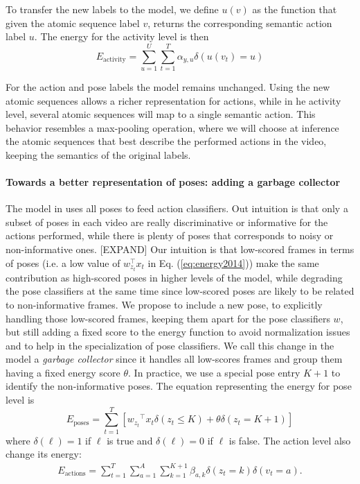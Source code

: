 To transfer the new labels to the model, we define $u(v)$ as the function that given the atomic sequence label $v$, returns the corresponding semantic action label $u$. The energy for the activity level is then
\begin{equation}
E_{\text{activity}} =  \sum_{u=1}^U\sum_{t=1}^T \alpha_{y,u}\delta(u(v_t)=u)
\end{equation}  

For the action and pose labels the model remains unchanged. Using the new atomic sequences allows a richer representation for actions, while in he activity level, several atomic sequences will map to a single semantic action. This behavior resembles a max-pooling operation, where we will choose at inference the atomic sequences that best describe the performed actions in the video, keeping the semantics of the original labels. 

\paragraph{Towards a better representation of poses: adding a garbage collector}

The model in \cite{Lillo2014} uses all poses to feed action classifiers. Out intuition is that only a subset of poses in each video are really discriminative or informative for the actions performed, while there is plenty of poses that corresponds to noisy or non-informative ones. [EXPAND] Our intuition is that low-scored frames in terms of poses (i.e. a low value of $w_{z_t}^\top x_t$ in Eq. (\ref{eq:energy2014})) make the same contribution as high-scored poses in higher levels of the model, while degrading the pose classifiers at the same time since low-scored poses are likely to be related to non-informative frames. We propose to include a new pose, to explicitly handling those low-scored frames, keeping them apart for the pose classifiers $w$, but still adding a fixed score to the energy function to avoid normalization issues and to help in the specialization of pose classifiers. We call this change in the model a \emph{garbage collector} since it handles all low-scores frames and group them having a fixed energy score $\theta$. In practice, we use a special pose entry $K+1$ to identify the non-informative poses. The equation representing the energy for pose level is
%
\begin{equation} \label{Eq_poseEnergy}
E_{\text{poses}}  = \sum_{t=1}^T \left[  {w_{z_t}}^\top x_{t}\delta(z_{t} \le  K) + \theta 
\delta(z_{t}=K+1)\right] 
\end{equation}
where $\delta(\ell) = 1$ if $\ell$ is true and $\delta(\ell) = 0$ if
$\ell$ is false. The action level also change its energy:
\begin{equation}
\begin{split}
 \label{Eq_actionEnergy}
E_{\text{actions}} =  \sum_{t=1}^T \sum_{a=1}^A \sum_{k=1}^{K+1}  \beta_{a,k} \delta(z_t = k) \delta(v_t = a).
\end{split}
\end{equation}

